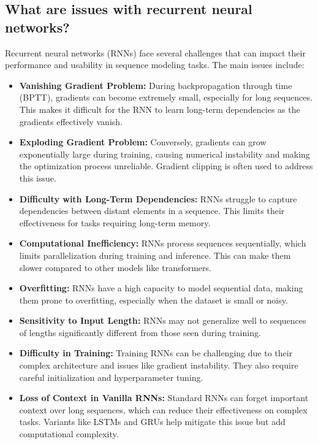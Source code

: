 \subsection{What are issues with recurrent neural networks?}

Recurrent neural networks (RNNs) face several challenges that can impact their performance and usability in sequence modeling tasks. The main issues include:

\begin{itemize}
    \item \textbf{Vanishing Gradient Problem:} During backpropagation through time (BPTT), gradients can become extremely small, especially for long sequences. This makes it difficult for the RNN to learn long-term dependencies as the gradients effectively vanish.

    \item \textbf{Exploding Gradient Problem:} Conversely, gradients can grow exponentially large during training, causing numerical instability and making the optimization process unreliable. Gradient clipping is often used to address this issue.

    \item \textbf{Difficulty with Long-Term Dependencies:} RNNs struggle to capture dependencies between distant elements in a sequence. This limits their effectiveness for tasks requiring long-term memory.

    \item \textbf{Computational Inefficiency:} RNNs process sequences sequentially, which limits parallelization during training and inference. This can make them slower compared to other models like transformers.

    \item \textbf{Overfitting:} RNNs have a high capacity to model sequential data, making them prone to overfitting, especially when the dataset is small or noisy.

    \item \textbf{Sensitivity to Input Length:} RNNs may not generalize well to sequences of lengths significantly different from those seen during training.

    \item \textbf{Difficulty in Training:} Training RNNs can be challenging due to their complex architecture and issues like gradient instability. They also require careful initialization and hyperparameter tuning.

    \item \textbf{Loss of Context in Vanilla RNNs:} Standard RNNs can forget important context over long sequences, which can reduce their effectiveness on complex tasks. Variants like LSTMs and GRUs help mitigate this issue but add computational complexity.

\end{itemize}

